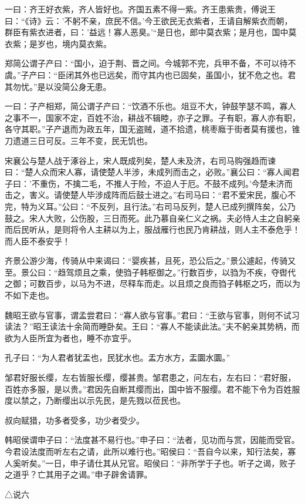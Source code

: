 \documentclass[]{article}
\begin{document}
一曰：齐王好衣紫，齐人皆好也。齐国五素不得一紫。齐王患紫贵，傅说王曰：``《诗》云：'不躬不亲，庶民不信。'今王欲民无衣紫者，王请自解紫衣而朝，群臣有紫衣进者，曰：'益远！寡人恶臭。'``是日也，郎中莫衣紫；是月也，国中莫衣紫；是岁也，境内莫衣紫。

郑简公谓子产曰：``国小，迫于荆、晋之间。今城郭不完，兵甲不备，不可以待不虞。''子产曰：``臣闭其外也已远矣，而守其内也已固矣，虽国小，犹不危之也。君其勿忧。''是以没简公身无患。

一曰：子产相郑，简公谓子产曰：``饮酒不乐也。俎豆不大，钟鼓竽瑟不鸣，寡人之事不一，国家不定，百姓不治，耕战不辑睦，亦子之罪。子有职，寡人亦有职，各守其职。''子产退而为政五年，国无盗贼，道不拾遗，桃枣廕于街者莫有援也，锥刀遗道三日可反。三年不变，民无饥也。

宋襄公与楚人战于涿谷上，宋人既成列矣，楚人未及济，右司马购强趋而谏曰：``楚人众而宋人寡，请使楚人半涉，未成列而击之，必败。''襄公曰：``寡人闻君子曰：'不重伤，不擒二毛，不推人于险，不迫人于厄。不鼓不成列。'今楚未济而击之，害义。请使楚人毕涉成阵而后鼓士进之。''右司马曰：``君不爱宋民，腹心不完，特为义耳。''公曰：``不反列，且行法。''右司马反列，楚人已成列撰阵矣，公乃鼓之。宋人大败，公伤股，三日而死。此乃慕自亲仁义之祸。夫必恃人主之自躬亲而后民听从，是则将令人主耕以为上，服战雁行也民乃肯耕战，则人主不泰危乎！而人臣不泰安乎！

齐景公游少海，传骑从中来谒曰：``婴疾甚，且死，恐公后之。''景公遽起，传骑又至。景公曰：``趋驾烦且之乘，使驺子韩枢御之。''行数百步，以驺为不疾，夺辔代之御；可数百步，以马为不进，尽释车而走。以且烦之良而驺子韩枢之巧，而以为不如下走也。

魏昭王欲与官事，谓孟尝君曰：``寡人欲与官事。''君曰：``王欲与官事，则何不试习读法？''昭王读法十余简而睡卧矣。王曰：``寡人不能读此法。''夫不躬亲其势柄，而欲为人臣所宜为者也，睡不亦宜乎。

孔子曰：``为人君者犹盂也，民犹水也。盂方水方，盂圜水圜。''

邹君好服长缨，左右皆服长缨，缨甚贵。邹君患之，问左右，左右曰：``君好服，百姓亦多服，是以贵。''君因先自断其缨而出，国中皆不服缨。君不能下令为百姓服度以禁之，乃断缨出以示先民，是先戮以莅民也。

叔向赋猎，功多者受多，功少者受少。

韩昭侯谓申子曰：``法度甚不易行也。''申子曰：``法者，见功而与赏，因能而受官。今君设法度而听左右之请，此所以难行也。''昭侯曰：``吾自今以来，知行法矣，寡人奚听矣。''一日，申子请仕其从兄官。昭侯曰：``非所学于子也。听子之谒，败子之道乎？亡其用子之谒。''申子辟舍请罪。

△说六
\end{document}
